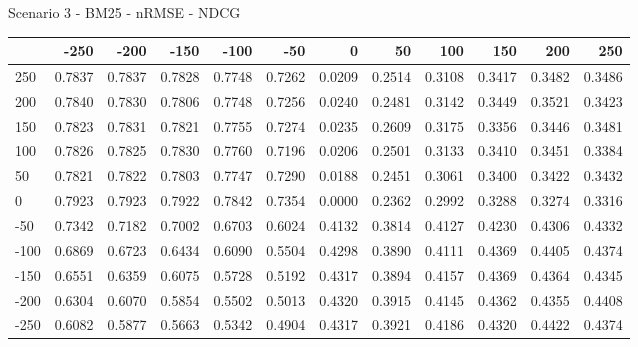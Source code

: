 Scenario 3 - BM25 - nRMSE - NDCG
\begin{tabular}{lrrrrrrrrrrr}
\toprule
{} &   -250 &   -200 &   -150 &   -100 &   -50  &    0   &    50  &    100 &    150 &    200 &    250 \\
\midrule
 250 & 0.7837 & 0.7837 & 0.7828 & 0.7748 & 0.7262 & 0.0209 & 0.2514 & 0.3108 & 0.3417 & 0.3482 & 0.3486 \\
 200 & 0.7840 & 0.7830 & 0.7806 & 0.7748 & 0.7256 & 0.0240 & 0.2481 & 0.3142 & 0.3449 & 0.3521 & 0.3423 \\
 150 & 0.7823 & 0.7831 & 0.7821 & 0.7755 & 0.7274 & 0.0235 & 0.2609 & 0.3175 & 0.3356 & 0.3446 & 0.3481 \\
 100 & 0.7826 & 0.7825 & 0.7830 & 0.7760 & 0.7196 & 0.0206 & 0.2501 & 0.3133 & 0.3410 & 0.3451 & 0.3384 \\
 50  & 0.7821 & 0.7822 & 0.7803 & 0.7747 & 0.7290 & 0.0188 & 0.2451 & 0.3061 & 0.3400 & 0.3422 & 0.3432 \\
 0   & 0.7923 & 0.7923 & 0.7922 & 0.7842 & 0.7354 & 0.0000 & 0.2362 & 0.2992 & 0.3288 & 0.3274 & 0.3316 \\
-50  & 0.7342 & 0.7182 & 0.7002 & 0.6703 & 0.6024 & 0.4132 & 0.3814 & 0.4127 & 0.4230 & 0.4306 & 0.4332 \\
-100 & 0.6869 & 0.6723 & 0.6434 & 0.6090 & 0.5504 & 0.4298 & 0.3890 & 0.4111 & 0.4369 & 0.4405 & 0.4374 \\
-150 & 0.6551 & 0.6359 & 0.6075 & 0.5728 & 0.5192 & 0.4317 & 0.3894 & 0.4157 & 0.4369 & 0.4364 & 0.4345 \\
-200 & 0.6304 & 0.6070 & 0.5854 & 0.5502 & 0.5013 & 0.4320 & 0.3915 & 0.4145 & 0.4362 & 0.4355 & 0.4408 \\
-250 & 0.6082 & 0.5877 & 0.5663 & 0.5342 & 0.4904 & 0.4317 & 0.3921 & 0.4186 & 0.4320 & 0.4422 & 0.4374 \\
\bottomrule
\end{tabular}

